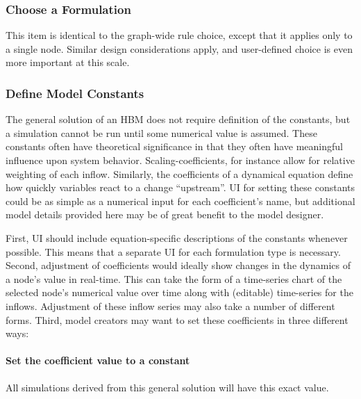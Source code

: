 \documentclass[conference]{IEEEtran}
\begin{document}
% 

\subsubsection{Choose a Formulation}
This item is identical to the graph-wide rule choice, except that it applies only to a single node. Similar design considerations apply, and user-defined choice is even more important at this scale.

\subsubsection{Define Model Constants}
The general solution of an HBM does not require definition of the constants, but a simulation cannot be run until some numerical value is assumed. 
These constants often have theoretical significance in that they often have meaningful influence upon system behavior. 
Scaling-coefficients, for instance allow for relative weighting of each inflow. 
Similarly, the coefficients of a dynamical equation define how quickly variables react to a change ``upstream''.
UI for setting these constants could be as simple as a numerical input for each coefficient's name, but additional model details provided here may be of great benefit to the model designer. 

First, UI should include equation-specific descriptions of the constants whenever possible. This means that a separate UI for each formulation type is necessary. 
Second, adjustment of coefficients would ideally show changes in the dynamics of a node's value in real-time. 
This can take the form of a time-series chart of the selected node's numerical value over time along with (editable) time-series for the inflows. 
Adjustment of these inflow series may also take a number of different forms. 
Third, model creators may want to set these coefficients in three different ways: 
\paragraph{Set the coefficient value to a constant}
All simulations derived from this general solution will have this exact value.
\end{document}
